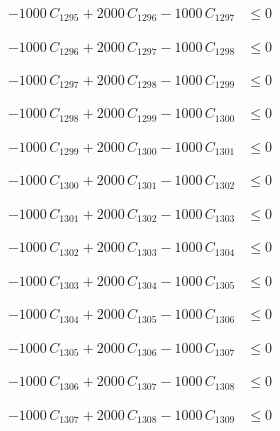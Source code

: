 \documentclass[a4paper,11pt]{article}
\begin{document}
\begin{align}
-1000\,C_{1295} + 2000\,C_{1296} - 1000\,C_{1297} &\leq 0 \nonumber
\end{align}

\begin{align}
-1000\,C_{1296} + 2000\,C_{1297} - 1000\,C_{1298} &\leq 0 \nonumber
\end{align}

\begin{align}
-1000\,C_{1297} + 2000\,C_{1298} - 1000\,C_{1299} &\leq 0 \nonumber
\end{align}

\begin{align}
-1000\,C_{1298} + 2000\,C_{1299} - 1000\,C_{1300} &\leq 0 \nonumber
\end{align}

\begin{align}
-1000\,C_{1299} + 2000\,C_{1300} - 1000\,C_{1301} &\leq 0 \nonumber
\end{align}

\begin{align}
-1000\,C_{1300} + 2000\,C_{1301} - 1000\,C_{1302} &\leq 0 \nonumber
\end{align}

\begin{align}
-1000\,C_{1301} + 2000\,C_{1302} - 1000\,C_{1303} &\leq 0 \nonumber
\end{align}

\begin{align}
-1000\,C_{1302} + 2000\,C_{1303} - 1000\,C_{1304} &\leq 0 \nonumber
\end{align}

\begin{align}
-1000\,C_{1303} + 2000\,C_{1304} - 1000\,C_{1305} &\leq 0 \nonumber
\end{align}

\begin{align}
-1000\,C_{1304} + 2000\,C_{1305} - 1000\,C_{1306} &\leq 0 \nonumber
\end{align}

\begin{align}
-1000\,C_{1305} + 2000\,C_{1306} - 1000\,C_{1307} &\leq 0 \nonumber
\end{align}

\begin{align}
-1000\,C_{1306} + 2000\,C_{1307} - 1000\,C_{1308} &\leq 0 \nonumber
\end{align}

\begin{align}
-1000\,C_{1307} + 2000\,C_{1308} - 1000\,C_{1309} &\leq 0 \nonumber
\end{align}
\end{document}
